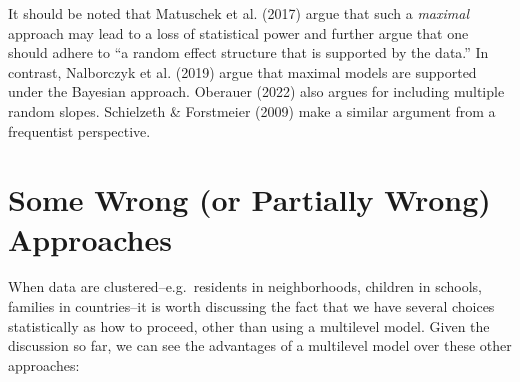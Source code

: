\documentclass[
  letterpaper,
  DIV=11,
  numbers=noendperiod]{scrreprt}
\begin{document}
It should be noted that Matuschek et al. (2017) argue that such a
\emph{maximal} approach may lead to a loss of statistical power and
further argue that one should adhere to ``a random effect structure that
is supported by the data.'' In contrast, Nalborczyk et al. (2019) argue
that maximal models are supported under the Bayesian approach. Oberauer
(2022) also argues for including multiple random slopes. Schielzeth \&
Forstmeier (2009) make a similar argument from a frequentist
perspective.

\hypertarget{sec-wrongapproaches}{%
\section{Some Wrong (or Partially Wrong)
Approaches}\label{sec-wrongapproaches}}

When data are clustered--e.g.~residents in neighborhoods, children in
schools, families in countries--it is worth discussing the fact that we
have several choices statistically as how to proceed, other than using a
multilevel model. Given the discussion so far, we can see the advantages
of a multilevel model over these other approaches:
\end{document}
